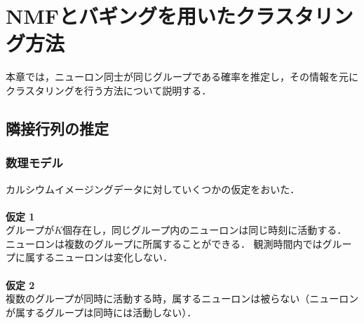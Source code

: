 \chapter{NMFとバギングを用いたクラスタリング方法}
本章では，ニューロン同士が同じグループである確率を推定し，その情報を元にクラスタリングを行う方法について説明する．

% 

\section{隣接行列の推定}

\subsection{数理モデル}
カルシウムイメージングデータに対していくつかの仮定をおいた．
\\ \\
\noindent \textbf{仮定 1}\\
グループが$K$個存在し，同じグループ内のニューロンは同じ時刻に活動する．
ニューロンは複数のグループに所属することができる．
観測時間内ではグループに属するニューロンは変化しない．
\\ \\
\textbf{仮定 2}\\
複数のグループが同時に活動する時，属するニューロンは被らない（ニューロンが属するグループは同時には活動しない）．
\\

